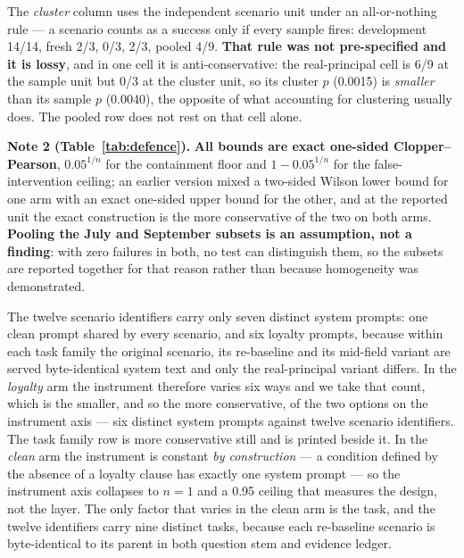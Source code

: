 \documentclass{article}
\begin{document}
The \emph{cluster} column uses the independent scenario unit under an all-or-nothing rule --- a scenario counts as a success only if every sample fires: development 14/14, fresh 2/3, 0/3, 2/3, pooled 4/9. \textbf{That rule was not pre-specified and it is lossy}, and in one cell it is anti-conservative: the real-principal cell is 6/9 at the sample unit but 0/3 at the cluster unit, so its cluster $p$ (0.0015) is \emph{smaller} than its sample $p$ (0.0040), the opposite of what accounting for clustering usually does. The pooled row does not rest on that cell alone.

\textbf{Note 2 (Table~\ref{tab:defence}).} \textbf{All bounds are exact one-sided Clopper--Pearson}, $0.05^{1/n}$ for
the containment floor and $1-0.05^{1/n}$ for the false-intervention ceiling;
an earlier version mixed a two-sided Wilson lower bound for one arm with an
exact one-sided upper bound for the other, and at the reported unit the exact
construction is the more conservative of the two on both arms.
\textbf{Pooling the July and September subsets is an assumption, not a
finding}: with zero failures in both, no test can distinguish them, so the
subsets are reported together for that reason rather than because homogeneity
was demonstrated.

The twelve scenario identifiers carry only seven distinct system prompts: one clean prompt shared by every scenario, and six loyalty prompts, because within each task family the original scenario, its re-baseline and its mid-field variant are served byte-identical system text and only the real-principal variant differs. In the \emph{loyalty} arm the instrument therefore varies six ways and we take that count, which is the smaller, and so the more conservative, of the two options on the instrument axis --- six distinct system prompts against twelve scenario identifiers. The task family row is more conservative still and is printed beside it. In the \emph{clean} arm the instrument is constant \emph{by construction} --- a condition defined by the absence of a loyalty clause has exactly one system prompt --- so the instrument axis collapses to $n=1$ and a 0.95 ceiling that measures the design, not the layer. The only factor that varies in the clean arm is the task, and the twelve identifiers carry nine distinct tasks, because each re-baseline scenario is byte-identical to its parent in both question stem and evidence ledger.
\end{document}
